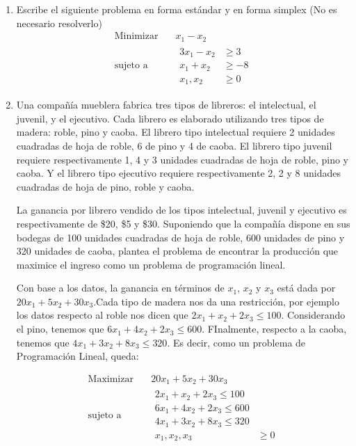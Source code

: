 \documentclass[twocolumn]{article}
\begin{document}
\begin{enumerate}
\item Escribe el siguiente problema en forma estándar y en forma simplex
(No es necesario resolverlo)
\begin{equation*}
\begin{aligned}
\text{Minimizar} \quad & x_{1}-x_{2}\\
\text{sujeto a} \quad &
  \begin{aligned}
   3x_{1}-x_{2} & \geq 3\\
   x_{1}+x_{2} &\geq -8\\
   x_{1},x_{2} &\geq 0
  \end{aligned}
\end{aligned}
\end{equation*}

\item Una compañía mueblera fabrica tres tipos de libreros: el
\guillemotleft{}intelectual\guillemotright{}, el \guillemotleft{}juvenil\guillemotright{}, y el \guillemotleft{}ejecutivo\guillemotright{}. Cada librero es
elaborado utilizando tres tipos de madera: roble, pino y caoba. El
librero tipo \guillemotleft{}intelectual\guillemotright{} requiere 2 unidades cuadradas de hoja de
roble, 6 de pino y 4 de caoba. El librero tipo \guillemotleft{}juvenil\guillemotright{} requiere
respectivamente 1, 4 y 3 unidades cuadradas de hoja de roble, pino
y caoba. Y el librero tipo \guillemotleft{}ejecutivo\guillemotright{} requiere respectivamente 2,
2 y 8 unidades cuadradas de hoja de pino, roble y caoba.

La ganancia por librero vendido de los tipos \guillemotleft{}intelectual\guillemotright{},
\guillemotleft{}juvenil\guillemotright{} y \guillemotleft{}ejecutivo\guillemotright{} es respectivamente de \$20, \$5 y
\$30. Suponiendo que la compañía dispone en sus bodegas de 100
unidades cuadradas de hoja de roble, 600 unidades de pino y 320
unidades de caoba, plantea el problema de encontrar la producción
que maximice el ingreso como un problema de programación lineal.

Con base a los datos, la ganancia en términos de $x_1$, $x_2$ y
$x_3$
está dada por $20x_1 + 5x_2 + 30x_3$.Cada tipo de madera nos da una
restricción, por ejemplo los datos respecto al roble nos dicen que
$2x_1 +x_2 +2x_3 \leq 100$. Considerando el pino, tenemos que $6x_1 +
4x_2 + 2x_3 \leq 600 $. FInalmente, respecto a la caoba, tenemos que
$4x_1 +3x_2 +8x_3 \leq 320$. Es decir, como un problema de
Programación Lineal, queda:


\begin{equation*}
\begin{aligned}
  \text{Maximizar} \quad & 20x_1 + 5x_2 + 30x_3\\
\text{sujeto a} \quad &
  \begin{aligned}
    2x_1 +x_2 +2x_3 \leq 100\\
    6x_1 +4x_2 + 2x_3 \leq 600 \\
    4x_1 +3x_2 +8x_3 \leq 320\\
    x_1,x_2,x_3 &\geq  0
  \end{aligned}
\end{aligned}
\end{equation*}


\end{enumerate}
\end{document}
